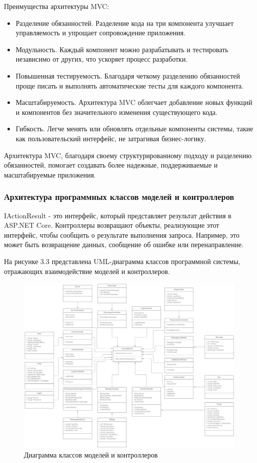 Преимущества архитектуры MVC:

\begin{itemize}
	\item Разделение обязанностей. Разделение кода на три компонента улучшает управляемость и упрощает сопровождение приложения.
	\item Модульность. Каждый компонент можно разрабатывать и тестировать независимо от других, что ускоряет процесс разработки.
	\item Повышенная тестируемость. Благодаря четкому разделению обязанностей проще писать и выполнять автоматические тесты для каждого компонента.
	\item Масштабируемость. Архитектура MVC облегчает добавление новых функций и компонентов без значительного изменения существующего кода.
	\item Гибкость. Легче менять или обновлять отдельные компоненты системы, такие как пользовательский интерфейс, не затрагивая бизнес-логику.
\end{itemize}

Архитектура MVC, благодаря своему структурированному подходу и разделению обязанностей, помогает создавать более надежные, поддерживаемые и масштабируемые приложения.

\subsubsection{Архитектура программных классов моделей и контроллеров}

IActionResult - это интерфейс, который представляет результат действия в ASP.NET Core. Контроллеры возвращают объекты, реализующие этот интерфейс, чтобы сообщить о результате выполнения запроса. Например, это может быть возвращение данных, сообщение об ошибке или перенаправление.

На рисунке 3.3 представлена UML-диаграмма классов программной системы, отражающих взаимодействие моделей и контроллеров.

\begin{figure}[H]
	\centering
	\includegraphics[width=0.9\linewidth]{images/DiagramArch2}
	\caption{Диаграмма классов моделей и контроллеров}
	\label{fig:diagramarch2}
\end{figure}

